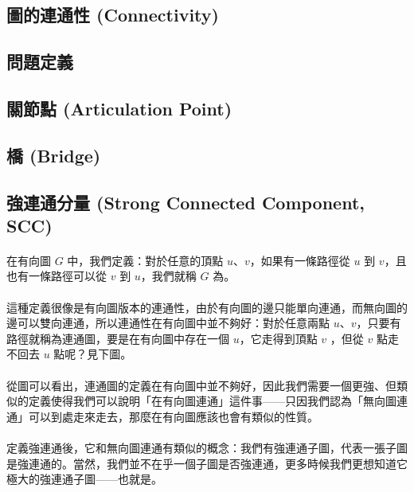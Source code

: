 \documentclass[12pt,a4paper,oneside]{report}
\begin{document}
\begin{CJK}{UTF8}{bkai}
\section{圖的連通性 (Connectivity)}
\subsection{問題定義}
\subsection{關節點 (Articulation Point)}
\subsection{橋 (Bridge)}

\subsection{強連通分量 (Strong Connected Component, SCC)}
\paragraph{}在有向圖 $G$ 中，我們定義：對於任意的頂點 $u$、$v$，如果有一條路徑從 $u$ 到 $v$，且也有一條路徑可以從 $v$ 到 $u$，我們就稱 $G$ 為\textbf{}。
\paragraph{}這種定義很像是有向圖版本的連通性，由於有向圖的邊只能單向連通，而無向圖的邊可以雙向連通，所以連通性在有向圖中並不夠好：對於任意兩點 $u$、$v$，只要有路徑就稱為連通圖，要是在有向圖中存在一個 $u$，它走得到頂點 $v$ ，但從 $v$ 點走不回去 $u$ 點呢？見下圖。
\paragraph{}從圖可以看出，連通圖的定義在有向圖中並不夠好，因此我們需要一個更強、但類似的定義使得我們可以說明「在有向圖連通」這件事------只因我們認為「無向圖連通」可以到處走來走去，那麼在有向圖應該也會有類似的性質。
\paragraph{}定義強連通後，它和無向圖連通有類似的概念：我們有強連通子圖，代表一張子圖是強連通的。當然，我們並不在乎一個子圖是否強連通，更多時候我們更想知道它極大的強連通子圖------也就是\textbf{}。

\end{CJK}
\end{document}

